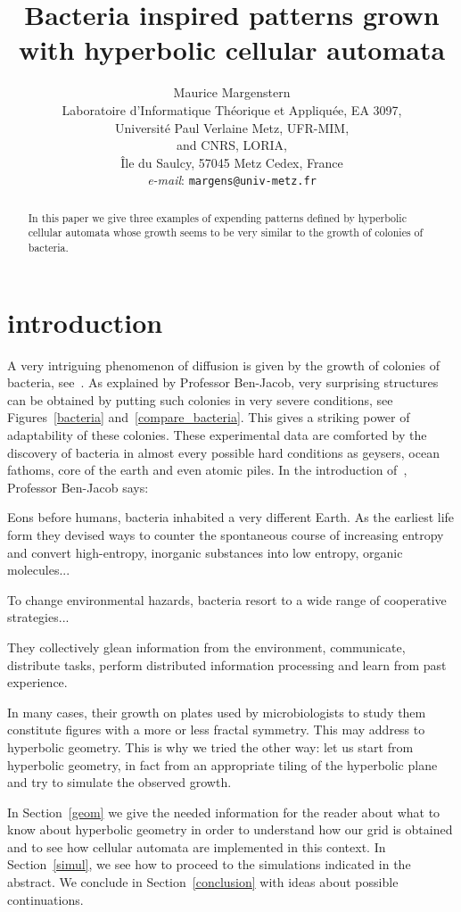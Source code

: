 \documentclass{article}
\title{
Bacteria inspired patterns grown with
hyperbolic cellular automata}
\author{Maurice Margenstern\\
Laboratoire d'Informatique Th\'eorique et Appliqu\'ee, EA 3097,\\
        Universit\'e Paul Verlaine  Metz, UFR-MIM, \\
        and CNRS, LORIA,\\
        \^Ile du Saulcy, 57045 Metz Cedex, France\\
{\it e-mail}: {\tt margens@univ-metz.fr}
}
\begin{document}
\maketitle

\begin{abstract}
In this paper we give three examples of expending patterns defined by
hyperbolic cellular automata whose growth seems to be very similar to the 
growth of colonies of bacteria.
\end{abstract}

\section{introduction}
\label{intro}
   A very intriguing phenomenon of diffusion is given by the growth of colonies
of bacteria, see~\cite{benjacob}. As 
explained by Professor Ben-Jacob, very surprising
structures can be obtained by putting such colonies in very severe conditions, 
see Figures~\ref{bacteria} and~\ref{compare_bacteria}. 
This gives a striking power of adaptability of these colonies. These 
experimental data are comforted by the discovery of bacteria in almost 
every possible hard 
conditions as geysers, ocean fathoms, core of the earth and even atomic piles.
In the introduction of~\cite{benjacob}, Professor Ben-Jacob says:
\vskip 7pt
{\leftskip 20pt\rightskip 20pt\small
Eons before humans, bacteria inhabited a very different Earth.
As the earliest life form they devised ways to counter the spontaneous
course of increasing entropy and convert high-entropy, inorganic substances
into low entropy, organic molecules...

To change environmental hazards, bacteria resort to a wide range of
cooperative strategies...

They collectively glean information from the environment, communicate,
distribute tasks, perform distributed information processing and learn
from past experience.
\par}
\vskip 7pt

   In many cases, their growth on plates used by microbiologists to study them
constitute figures with a more or less fractal symmetry. This may address to
hyperbolic geometry. This is why we tried the other way: let us start from
hyperbolic geometry, in fact from an appropriate tiling of the hyperbolic plane
and try to simulate the observed growth.

   In Section~\ref{geom} we give the needed information for the reader about 
what to know about hyperbolic geometry in order to understand how our grid is 
obtained and to see how cellular automata are implemented in this context.
In Section~\ref{simul}, we see how to proceed to the simulations indicated
in the abstract. We conclude in Section~\ref{conclusion} with ideas about
possible continuations.
\end{document}
